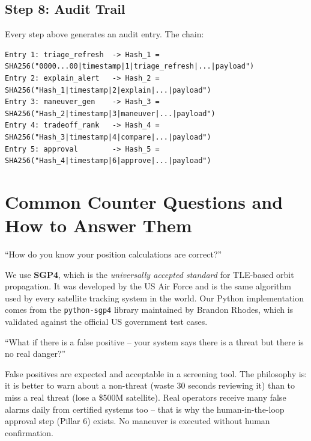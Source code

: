 \documentclass[12pt,a4paper]{article}
\begin{document}
\subsection{Step 8: Audit Trail}
Every step above generates an audit entry. The chain:
\begin{lstlisting}[language={}]
Entry 1: triage_refresh  -> Hash_1 = SHA256("0000...00|timestamp|1|triage_refresh|...|payload")
Entry 2: explain_alert   -> Hash_2 = SHA256("Hash_1|timestamp|2|explain|...|payload")
Entry 3: maneuver_gen    -> Hash_3 = SHA256("Hash_2|timestamp|3|maneuver|...|payload")
Entry 4: tradeoff_rank   -> Hash_4 = SHA256("Hash_3|timestamp|4|compare|...|payload")
Entry 5: approval        -> Hash_5 = SHA256("Hash_4|timestamp|6|approve|...|payload")
\end{lstlisting}

\newpage
\section{Common Counter Questions and How to Answer Them}

\begin{questionbox}
``How do you know your position calculations are correct?''
\end{questionbox}
\begin{answerbox}
We use \textbf{SGP4}, which is the \textit{universally accepted standard} for TLE-based orbit propagation. It was developed by the US Air Force and is the same algorithm used by every satellite tracking system in the world. Our Python implementation comes from the \texttt{python-sgp4} library maintained by Brandon Rhodes, which is validated against the official US government test cases.
\end{answerbox}

\begin{questionbox}
``What if there is a false positive -- your system says there is a threat but there is no real danger?''
\end{questionbox}
\begin{answerbox}
False positives are expected and acceptable in a screening tool. The philosophy is: it is better to warn about a non-threat (waste 30 seconds reviewing it) than to miss a real threat (lose a \$500M satellite). Real operators receive many false alarms daily from certified systems too -- that is why the human-in-the-loop approval step (Pillar 6) exists. No maneuver is executed without human confirmation.
\end{answerbox}
\end{document}

